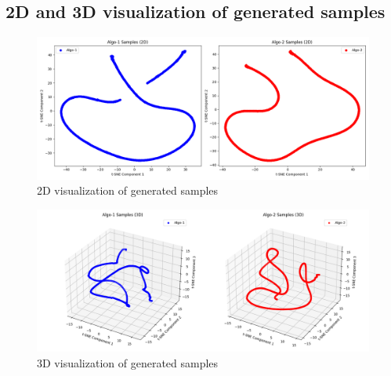 \documentclass{article}
\begin{document}
\subsection{2D and 3D visualization of generated samples}
\begin{figure}[H]
    \centering
    \includegraphics[width=\linewidth]{TASK-0-1/algo_samples_2d.png}
    \caption{2D visualization of generated samples}
    \label{fig:2d_samples}
\end{figure}
\begin{figure}[H]
    \centering
    \includegraphics[width=\linewidth]{TASK-0-1/algo_samples_3d.png}
    \caption{3D visualization of generated samples}
    \label{fig:3d_samples}
\end{figure}
\end{document}
